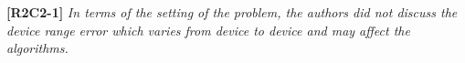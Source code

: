 \documentclass{letter}
\newcommand{\vv}{\overrightarrow}
\begin{document}




\textbf{[R2C2-1]} \emph{In terms of the setting of the problem, the authors did not discuss the device range error which varies from device to device and may affect the algorithms.}
\end{document}
